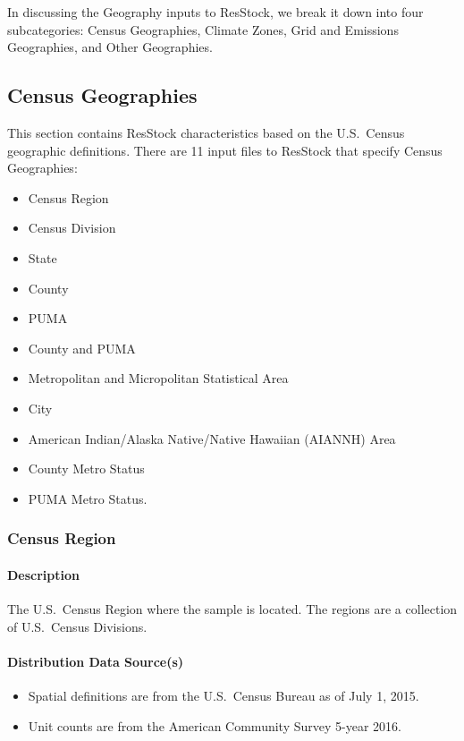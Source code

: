 In discussing the Geography inputs to ResStock, we break it down into four subcategories: Census Geographies, Climate Zones, Grid and Emissions Geographies, and Other Geographies.

\subsection{Census Geographies}
This section contains ResStock characteristics based on the U.S.~Census geographic definitions. There are 11 input files to ResStock that specify Census Geographies:
\begin{itemize}
    \item Census Region
    \item Census Division
    \item State
    \item County
    \item PUMA
    \item County and PUMA
    \item Metropolitan and Micropolitan Statistical Area
    \item City
    \item American Indian/Alaska Native/Native Hawaiian (AIANNH) Area
    \item County Metro Status
    \item PUMA Metro Status.
\end{itemize}


\subsubsection{Census Region}
\paragraph{Description}
The U.S.~Census Region where the sample is located. The regions are a collection of U.S.~Census Divisions.

\paragraph{Distribution Data Source(s)}
\begin{itemize} 
\item
  Spatial definitions are from the U.S.~Census Bureau as of July 1,
  2015.
\item
  Unit counts are from the American Community Survey 5-year 2016.
\end{itemize}

